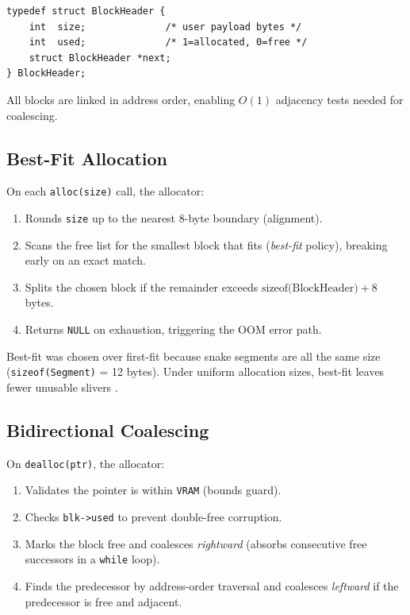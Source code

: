 \documentclass[conference]{IEEEtran}
\begin{document}
\begin{lstlisting}
typedef struct BlockHeader {
    int  size;              /* user payload bytes */
    int  used;              /* 1=allocated, 0=free */
    struct BlockHeader *next;
} BlockHeader;
\end{lstlisting}

All blocks are linked in address order, enabling $O(1)$ adjacency tests needed
for coalescing.

\subsection{Best-Fit Allocation}

On each \texttt{alloc(size)} call, the allocator:
\begin{enumerate}
  \item Rounds \texttt{size} up to the nearest 8-byte boundary (alignment).
  \item Scans the free list for the smallest block that fits (\emph{best-fit}
        policy), breaking early on an exact match.
  \item Splits the chosen block if the remainder exceeds
        \(\text{sizeof(BlockHeader)} + 8\) bytes.
  \item Returns \texttt{NULL} on exhaustion, triggering the OOM error path.
\end{enumerate}

Best-fit was chosen over first-fit because snake segments are all the same
size (\texttt{sizeof(Segment)} = 12 bytes). Under uniform allocation sizes,
best-fit leaves fewer unusable slivers \cite{knuth1997art}.

\subsection{Bidirectional Coalescing}

On \texttt{dealloc(ptr)}, the allocator:
\begin{enumerate}
  \item Validates the pointer is within \texttt{VRAM} (bounds guard).
  \item Checks \texttt{blk->used} to prevent double-free corruption.
  \item Marks the block free and coalesces \emph{rightward} (absorbs
        consecutive free successors in a \texttt{while} loop).
  \item Finds the predecessor by address-order traversal and coalesces
        \emph{leftward} if the predecessor is free and adjacent.
\end{enumerate}
\end{document}
